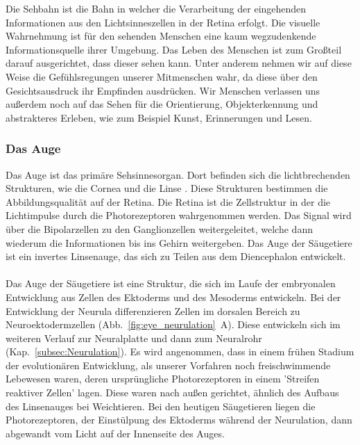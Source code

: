 \documentclass[12pt,a4paper,pdftex]{article}
\begin{document}
Die Sehbahn ist die Bahn in welcher die Verarbeitung der eingehenden Informationen aus den Lichtsinneszellen in der Retina erfolgt. Die visuelle Wahrnehmung ist für den sehenden Menschen eine kaum wegzudenkende Informationsquelle ihrer Umgebung. Das Leben des Menschen ist zum Großteil darauf ausgerichtet, dass dieser sehen kann. Unter anderem nehmen wir auf diese Weise die Gefühlsregungen unserer Mitmenschen wahr, da diese über den Gesichtsausdruck ihr Empfinden ausdrücken. Wir Menschen verlassen uns außerdem noch auf das Sehen für die Orientierung, Objekterkennung und abstrakteres Erleben, wie zum Beispiel Kunst, Erinnerungen und Lesen.


\subsubsection*{Das Auge}
Das Auge ist das primäre Sehsinnesorgan. Dort befinden sich die lichtbrechenden Strukturen, wie die Cornea  und die Linse . Diese Strukturen  bestimmen die Abbildungsqualität auf der Retina. Die Retina ist die Zellstruktur in der die Lichtimpulse durch die Photorezeptoren wahrgenommen werden. Das Signal wird über die Bipolarzellen zu den Ganglionzellen weitergeleitet, welche dann wiederum die Informationen bis ins Gehirn weitergeben.
Das Auge der Säugetiere ist ein invertes Linsenauge,  das sich zu Teilen aus dem Diencephalon entwickelt. 
\\
\\
Das Auge der Säugetiere ist eine Struktur, die sich im Laufe der embryonalen Entwicklung aus Zellen des Ektoderms und des Mesoderms entwickeln. Bei der Entwicklung der Neurula differenzieren Zellen im dorsalen Bereich zu Neuroektodermzellen  (Abb.~\ref{fig:eye_neurulation}~A). Diese entwickeln sich im weiteren Verlauf zur Neuralplatte und dann zum Neuralrohr (Kap.~\ref{subsec:Neurulation}). 
Es wird angenommen, dass in einem frühen Stadium der evolutionären Entwicklung, als unserer Vorfahren noch freischwimmende Lebewesen waren, deren ursprüngliche Photorezeptoren in einem 'Streifen reaktiver Zellen' lagen. Diese waren nach außen gerichtet, ähnlich des Aufbaus des Linsenauges bei Weichtieren. Bei den heutigen Säugetieren liegen die Photorezeptoren, der Einstülpung des Ektoderms während der Neurulation, dann abgewandt vom Licht auf der Innenseite des Auges. 
\end{document}
